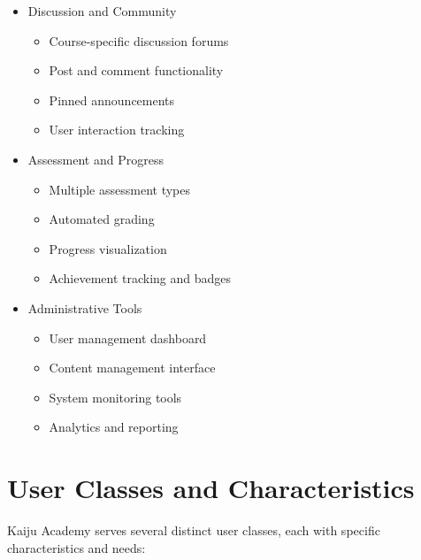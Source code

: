 \documentclass[a4paper, 11pt]{scrreprt}
\begin{document}
\begin{itemize}
    \item Discussion and Community
        \begin{itemize}
            \item Course-specific discussion forums
            \item Post and comment functionality
            \item Pinned announcements
            \item User interaction tracking
        \end{itemize}
    
    \item Assessment and Progress
        \begin{itemize}
            \item Multiple assessment types
            \item Automated grading
            \item Progress visualization
            \item Achievement tracking and badges
        \end{itemize}
    
    \item Administrative Tools
        \begin{itemize}
            \item User management dashboard
            \item Content management interface
            \item System monitoring tools
            \item Analytics and reporting
        \end{itemize}
\end{itemize}

\section{User Classes and Characteristics}

Kaiju Academy serves several distinct user classes, each with specific characteristics and needs:
\end{document}
